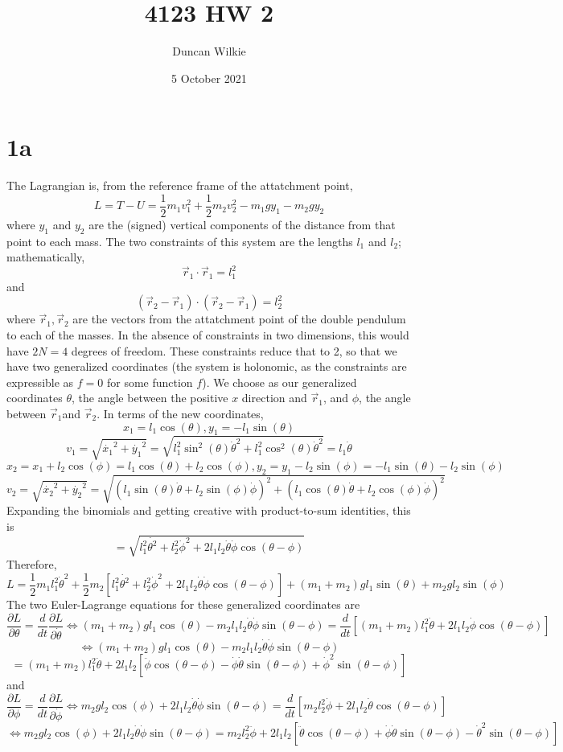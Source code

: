 \documentclass{article}
\title{4123 HW 2}
\author{Duncan Wilkie}
\date{5 October 2021}
\begin{document}
\maketitle

\section*{1a}
The Lagrangian is, from the reference frame of the attatchment point,
\[L=T-U=\frac{1}{2}m_1v_1^2+\frac{1}{2}m_2v_2^2-m_1gy_1-m_2gy_2\]
where $y_1$ and $y_2$ are the (signed) vertical components of the distance from that point to each mass.
The two constraints of this system are the lengths $l_1$ and $l_2$; mathematically,
\[\vec{r}_1\cdot\vec{r}_1=l_1^2\]
and
\[(\vec{r}_2-\vec{r}_1)\cdot(\vec{r}_2-\vec{r}_1)=l_2^2\]
where $\vec{r}_1, \vec{r}_2$ are the vectors from the attatchment point of the double pendulum to each of the masses.
In the absence of constraints in two dimensions, this would have $2N=4$ degrees of freedom.
These constraints reduce that to 2, so that we have two generalized coordinates (the system is holonomic, as the constraints are expressible as $f=0$ for some function $f$).
We choose as our generalized coordinates $\theta$, the angle between the positive $x$ direction and $\vec{r}_1$, and $\phi$, the angle between $\vec{r}_1$and $\vec{r}_2$.
In terms of the new coordinates,
\[x_1= l_1\cos(\theta), y_1=-l_1\sin(\theta)\] \[v_1=\sqrt{\dot{x_1}^2+\dot{y_1}^2}=\sqrt{l_1^2\sin^2(\theta)\dot{\theta}^2+l_1^2\cos^2(\theta)\dot{\theta}^2}=l_1\dot{\theta}\]
\[x_2=x_1+l_2\cos(\phi)=l_1\cos(\theta)+l_2\cos(\phi), y_2=y_1-l_2\sin(\phi)=-l_1\sin(\theta)-l_2\sin(\phi)\]
\[v_2=\sqrt{\dot{x_2}^2+\dot{y_2}^2}=\sqrt{(l_1\sin(\theta)\dot{\theta}+l_2\sin(\phi)\dot{\phi})^2+(l_1\cos(\theta)\dot{\theta}+l_2\cos(\phi)\dot{\phi})^2}\]
Expanding the binomials and getting creative with product-to-sum identities, this is
\[=\sqrt{l_1^2\dot{\theta^2}+l_2^2\dot{\phi}^2+2l_1l_2\dot{\theta}\dot{\phi}\cos(\theta-\phi)}\]
Therefore,
\[L=\frac{1}{2}m_1l_1^2\dot{\theta}^2+\frac{1}{2}m_2[l_1^2\dot{\theta^2}+l_2^2\dot{\phi}^2+2l_1l_2\dot{\theta}\dot{\phi}\cos(\theta-\phi)]+(m_1+m_2)gl_1\sin(\theta)+m_2gl_2\sin(\phi)\]
The two Euler-Lagrange equations for these generalized coordinates are
\[\frac{\partial L}{\partial \theta}=\frac{d}{dt}\frac{\partial L }{\partial \dot{\theta}}\Leftrightarrow(m_1+m_2)gl_1\cos(\theta)-m_2l_1l_2\dot{\theta}\dot{\phi}\sin(\theta-\phi)=\frac{d}{dt}[(m_1+m_2)l_1^2\dot{\theta}+2l_1l_2\dot{\phi}\cos(\theta-\phi)]\]
\[\Leftrightarrow (m_1+m_2)gl_1\cos(\theta)-m_2l_1l_2\dot{\theta}\dot{\phi}\sin(\theta-\phi) \]\[= (m_1+m_2)l_1^2\ddot{\theta}+2l_1l_2[\ddot{\phi}\cos(\theta-\phi)-\dot{\phi}\dot{\theta}\sin(\theta-\phi)+\dot{\phi}^2\sin(\theta-\phi)]\]
and
\[\frac{\partial L}{\partial \phi}=\frac{d}{dt}\frac{\partial L}{\partial \dot{\phi}}\Leftrightarrow m_2gl_2\cos(\phi)+2l_1l_2\dot{\theta}\dot{\phi}\sin(\theta-\phi)=\frac{d}{dt}[m_2l_2^2\dot{\phi}+2l_1l_2\dot{\theta}\cos(\theta-\phi)]\]
\[\Leftrightarrow m_2gl_2\cos(\phi)+2l_1l_2\dot{\theta}\dot{\phi}\sin(\theta-\phi)=m_2l_2^2\ddot{\phi}+2l_1l_2[\ddot{\theta}\cos(\theta-\phi)+\dot{\phi}\dot{\theta}\sin(\theta-\phi)-\dot{\theta}^2\sin(\theta-\phi)]\]
\end{document}
